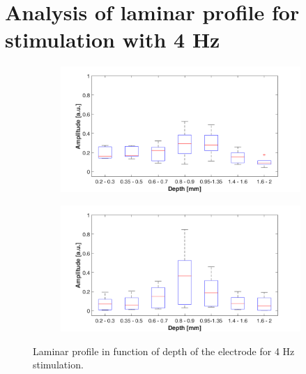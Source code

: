 \documentclass{pracalicmgr}
\begin{document}
\section{Analysis of laminar profile for stimulation with 4 Hz} 
   	\begin{figure}[H]
	\begin{subfigure}{.5\textwidth}
		\centering
		\includegraphics[width=1.\linewidth]{profile_4Hz_wid.png}
		\caption{}
		\label{rys:profil_4Hz_wid1}
	\end{subfigure}%
	\begin{subfigure}{.5\textwidth}
		\centering
		\includegraphics[width=1.\linewidth]{profile_4Hz_wid2.png}
		\caption{}
		\label{rys:profil_4Hz_wid2}
	\end{subfigure}
	
	\caption{Laminar profile in function of depth of the electrode for 4 Hz stimulation.}
	\label{rys:profil_4Hz_wid}
\end{figure}
\end{document}

